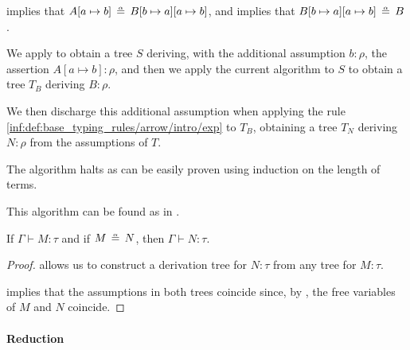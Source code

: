 \begin{algorithm}
\begin{thmenum}
\begin{thmenum}
       implies that \( A[a \mapsto b] \aequiv B[b \mapsto a][a \mapsto b] \), and  implies that \( B[b \mapsto a][a \mapsto b] \aequiv B \).

      We apply  to obtain a tree \( S \) deriving, with the additional assumption \( b: \rho \), the assertion \( A[a \mapsto b]: \rho \), and then we apply the current algorithm to \( S \) to obtain a tree \( T_B \) deriving \( B: \rho \).

      We then discharge this additional assumption when applying the rule \ref{inf:def:base_typing_rules/arrow/intro/exp} to \( T_B \), obtaining a tree \( T_N \) deriving \( N: \rho \) from the assumptions of \( T \).
    \end{thmenum}
  \end{thmenum}
\end{algorithm}
\begin{defproof}
  The algorithm halts as can be easily proven using induction on the length of terms.
\end{defproof}
\begin{comments}
  \item This algorithm can be found as  in \cite{notebook:code}.
\end{comments}

\begin{proposition}\label{thm:alpha_equivalent_term_typing}
  If \( \Gamma \vdash M: \tau \) and if \( M \aequiv N \), then \( \Gamma \vdash N: \tau \).
\end{proposition}
\begin{proof}
   allows us to construct a derivation tree for \( N: \tau \) from any tree for \( M: \tau \).

   implies that the assumptions in both trees coincide since, by , the free variables of \( M \) and \( N \) coincide.
\end{proof}

\paragraph{Reduction}


